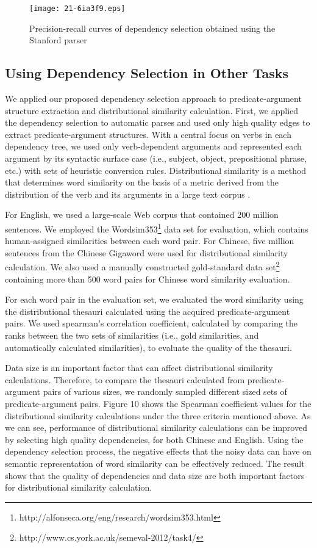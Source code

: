 \documentclass[english]{jnlp_1.4}
\begin{document}
\begin{figure}[t]
\begin{center}
\texttt{[image: 21-6ia3f9.eps]}
\end{center}
 \caption{Precision-recall curves of dependency selection obtained using the Stanford parser}
\end{figure}


\subsection{Using Dependency Selection in Other Tasks}

We applied our proposed dependency selection approach to predicate-argument structure extraction and distributional similarity calculation.
First, we applied the dependency selection to automatic parses and used only high quality edges to extract predicate-argument structures. 
With a central focus on verbs in each dependency tree, we used only verb-dependent arguments and represented each argument by its syntactic surface case (i.e., subject, object, prepositional phrase, etc.) 
with sets of heuristic conversion rules.
Distributional similarity is a method that determines word similarity on the basis of a metric derived
from the distribution of the verb and its arguments 
in a large text corpus \cite{Lin:1998:ACLCOLING}.

For English, we used a large-scale Web corpus that contained 200 million sentences.
We employed the Wordsim353\footnote{http://alfonseca.org/eng/research/wordsim353.html} data set for evaluation,
which contains human-assigned similarities between each word pair.
For Chinese, five million sentences from the Chinese Gigaword were used for distributional similarity calculation.
We also used a manually constructed gold-standard data set\footnote{http://www.cs.york.ac.uk/semeval-2012/task4/} containing more than 500 word pairs for Chinese word similarity evaluation.

For each word pair in the evaluation set, we evaluated the word similarity using the distributional thesauri
calculated using the acquired predicate-argument pairs. We used spearman's correlation coefficient, calculated by comparing the ranks between the two sets of similarities (i.e., gold similarities, and automatically calculated similarities), to evaluate the quality of the thesauri.

Data size is an important factor that can affect distributional similarity calculations.
Therefore, to compare the thesauri calculated from predicate-argument pairs of various sizes, 
we randomly sampled different sized sets of predicate-argument pairs.
Figure 10 shows the Spearman coefficient values for the distributional similarity calculations under the three criteria mentioned above.
As we can see, performance of distributional similarity calculations can be improved by selecting high quality dependencies, for both Chinese and English.
Using the dependency selection process, the negative effects that the noisy data can have on semantic representation of word similarity can be effectively reduced.
The result shows that the quality of dependencies and data size are both important factors for distributional similarity calculation.
\end{document}
